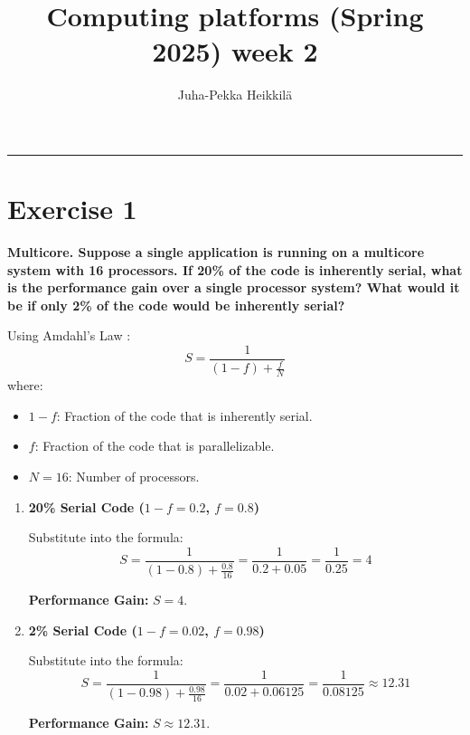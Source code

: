 \documentclass{article}
\title{Computing platforms (Spring 2025)\newline
week 2}
\author{Juha-Pekka Heikkilä}
\renewcommand{\maketitle}{%
  \begin{leftmark}
    \vspace*{\baselineskip} %



    \textbf{\fontsize{18}{36}\selectfont \thetitle} %

     \vspace{0.05cm} %
    \vspace{\baselineskip} %
     \rule{\textwidth}{0.4pt} %

   \end{leftmark}
}
\newcommand{\exercise}[1]{
    \section*{Exercise #1}
    \markboth{Exercise #1}{}
}
\begin{document}
\maketitle


\exercise{1}
{\bf Multicore. Suppose a single application is running on
a multicore system with 16 processors. If 20\% of the code
is inherently serial, what is the performance gain over
a single processor system? What would it be if only 2\% of
the code would be inherently serial?}

Using Amdahl's Law \cite{stallings4.3}:
\[
S = \frac{1}{(1 - f) + \frac{f}{N}}
\]
where:
\begin{itemize}
    \item \( 1 - f \): Fraction of the code that is inherently serial.
    \item \( f \): Fraction of the code that is parallelizable.
    \item \( N = 16 \): Number of processors.
\end{itemize}

\begin{enumerate}[label=\textbf{\alph*})]
    \item \textbf{20\% Serial Code (\( 1 - f = 0.2 \), \( f = 0.8 \))}

    Substitute into the formula:
    \[
    S = \frac{1}{(1 - 0.8) + \frac{0.8}{16}} = \frac{1}{0.2 + 0.05} = \frac{1}{0.25} = 4
    \]

    \textbf{Performance Gain:} \( S = 4 \).

    \item \textbf{2\% Serial Code (\( 1 - f = 0.02 \), \( f = 0.98 \))}

    Substitute into the formula:
    \[
    S = \frac{1}{(1 - 0.98) + \frac{0.98}{16}} = \frac{1}{0.02 + 0.06125} = \frac{1}{0.08125} \approx 12.31
    \]

    \textbf{Performance Gain:} \( S \approx 12.31 \).
\end{enumerate}

\newpage


\end{document}
